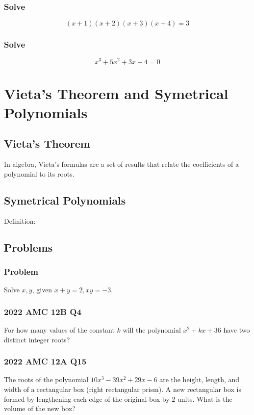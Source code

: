 \documentclass{article}
\begin{document}
\subsubsection{Solve}
$$(x+1)(x+2)(x+3)(x+4)=3$$
\vspace{40px}

\subsubsection{Solve}
$$x^3 + 5 x^2 + 3 x - 4 = 0$$
\vspace{40px}

\section{Vieta's Theorem and Symetrical Polynomials}
\subsection{Vieta's Theorem}
In algebra, Vieta's formulas are a set of results that relate the coefficients of a polynomial to its roots. 

\pagebreak

\subsection{Symetrical Polynomials}
Definition:
\vspace{30px}
\subsection{Problems}
\subsubsection{Problem}
Solve $x, y$, given $x+y=2, xy=-3$.
\vspace{60px}
\subsubsection{2022 AMC 12B Q4}
For how many values of the constant $k$ will the polynomial $x^{2}+kx+36$ have two distinct integer roots?
\vspace{60px}
\subsubsection{2022 AMC 12A Q15}
The roots of the polynomial $10x^3-39x^2+29x-6$ are the height, length, and width of a rectangular box (right rectangular prism). A new rectangular box is formed by lengthening each edge of the original box by $2$ units. What is the volume of the new box?
\pagebreak
\end{document}
